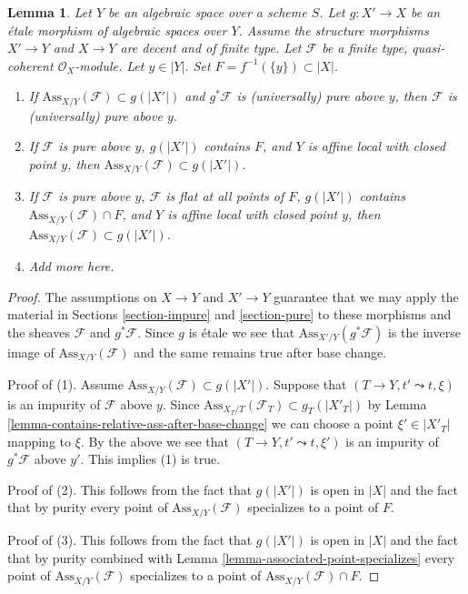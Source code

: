 \documentclass{stacks-project}
\theoremstyle{plain}
\newtheorem{lemma}[subsection]{Lemma}
\theoremstyle{definition}
\theoremstyle{remark}
\numberwithin{equation}{subsection}
\begin{document}
\begin{lemma}
\label{lemma-pure-on-top}
Let $Y$ be an algebraic space over a scheme $S$. Let $g : X' \to X$ be an
\'etale morphism of algebraic spaces over $Y$. Assume the structure
morphisms $X' \to Y$ and $X \to Y$ are decent and of finite type.
Let $\mathcal{F}$ be a finite type, quasi-coherent $\mathcal{O}_X$-module.
Let $y \in |Y|$. Set $F = f^{-1}(\{y\}) \subset |X|$.
\begin{enumerate}
\item If $\text{Ass}_{X/Y}(\mathcal{F}) \subset g(|X'|)$
and $g^*\mathcal{F}$ is (universally) pure above $y$, then
$\mathcal{F}$ is (universally) pure above $y$.
\item If $\mathcal{F}$ is pure above $y$, $g(|X'|)$ contains $F$, and
$Y$ is affine local with closed point $y$, then
$\text{Ass}_{X/Y}(\mathcal{F}) \subset g(|X'|)$.
\item If $\mathcal{F}$ is pure above $y$, $\mathcal{F}$ is flat
at all points of $F$, $g(|X'|)$ contains
$\text{Ass}_{X/Y}(\mathcal{F}) \cap F$, and $Y$ is affine local
with closed point $y$, then
$\text{Ass}_{X/Y}(\mathcal{F}) \subset g(|X'|)$.
\item Add more here.
\end{enumerate}
\end{lemma}

\begin{proof}
The assumptions on $X \to Y$ and $X' \to Y$ guarantee that
we may apply the material in Sections \ref{section-impure} and
\ref{section-pure}
to these morphisms and the sheaves $\mathcal{F}$ and $g^*\mathcal{F}$.
Since $g$ is \'etale we see that
$\text{Ass}_{X'/Y}(g^*\mathcal{F})$
is the inverse image of $\text{Ass}_{X/Y}(\mathcal{F})$
and the same remains true after base change.

\medskip\noindent
Proof of (1). Assume $\text{Ass}_{X/Y}(\mathcal{F}) \subset g(|X'|)$.
Suppose that $(T \to Y, t' \leadsto t, \xi)$
is an impurity of $\mathcal{F}$ above $y$. Since
$\text{Ass}_{X_T/T}(\mathcal{F}_T) \subset g_T(|X'_T|)$ by
Lemma \ref{lemma-contains-relative-ass-after-base-change}
we can choose
a point $\xi' \in |X'_T|$ mapping to $\xi$. By the above we see
that $(T \to Y, t' \leadsto t, \xi')$ is an impurity of
$g^*\mathcal{F}$ above $y'$. This implies (1) is true.

\medskip\noindent
Proof of (2). This follows from the fact that $g(|X'|)$ is open
in $|X|$ and the fact that by purity every point of
$\text{Ass}_{X/Y}(\mathcal{F})$ specializes to a point of $F$.

\medskip\noindent
Proof of (3). This follows from the fact that $g(|X'|)$ is open
in $|X|$ and the fact that by purity combined with
Lemma \ref{lemma-associated-point-specializes} every point of
$\text{Ass}_{X/Y}(\mathcal{F})$ specializes to a point of
$\text{Ass}_{X/Y}(\mathcal{F}) \cap F$.
\end{proof}
\end{document}
